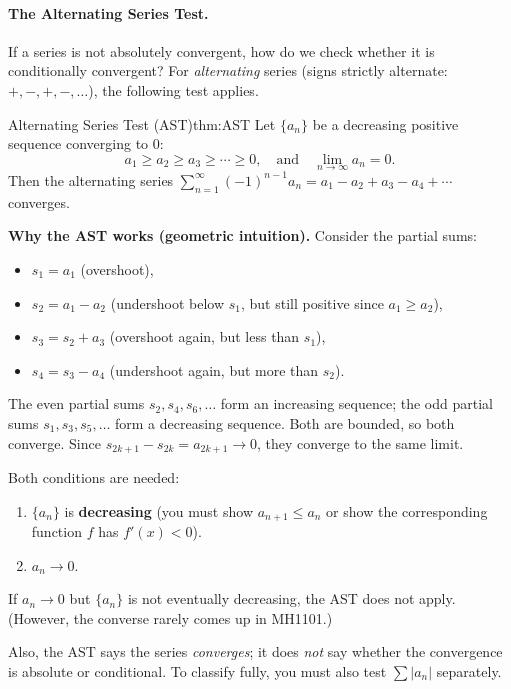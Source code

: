 \paragraph{The Alternating Series Test.}

If a series is not absolutely convergent, how do we check whether it is conditionally convergent?
For \emph{alternating} series (signs strictly alternate: $+,-,+,-,\ldots$), the following test applies.

\begin{theorem}{Alternating Series Test (AST)}{thm:AST}
Let $\{a_n\}$ be a decreasing positive sequence converging to $0$:
\[
a_1\ge a_2\ge a_3\ge \cdots \ge 0,\quad \text{and}\quad \lim_{n\to\infty}a_n=0.
\]
Then the alternating series $\displaystyle\sum_{n=1}^{\infty}(-1)^{n-1}a_n=a_1-a_2+a_3-a_4+\cdots$ converges.
\end{theorem}

\noindent
\textbf{Why the AST works (geometric intuition).}
Consider the partial sums:
\begin{itemize}[leftmargin=*]
\item $s_1=a_1$ (overshoot),
\item $s_2=a_1-a_2$ (undershoot below $s_1$, but still positive since $a_1\ge a_2$),
\item $s_3=s_2+a_3$ (overshoot again, but less than $s_1$),
\item $s_4=s_3-a_4$ (undershoot again, but more than $s_2$).
\end{itemize}
The even partial sums $s_2,s_4,s_6,\ldots$ form an increasing sequence; the odd partial sums $s_1,s_3,s_5,\ldots$ form a decreasing sequence. Both are bounded, so both converge. Since $s_{2k+1}-s_{2k}=a_{2k+1}\to 0$, they converge to the same limit.

\begin{commonmistake}[title={Common Mistake: AST requires TWO conditions}]
Both conditions are needed:
\begin{enumerate}[leftmargin=3em]
\item $\{a_n\}$ is \textbf{decreasing} (you must show $a_{n+1}\le a_n$ or show the corresponding function $f$ has $f'(x)<0$).
\item $a_n\to 0$.
\end{enumerate}
If $a_n\to 0$ but $\{a_n\}$ is not eventually decreasing, the AST does not apply. (However, the converse rarely comes up in MH1101.)

Also, the AST says the series \emph{converges}; it does \emph{not} say whether the convergence is absolute or conditional. To classify fully, you must also test $\sum |a_n|$ separately.
\end{commonmistake}

